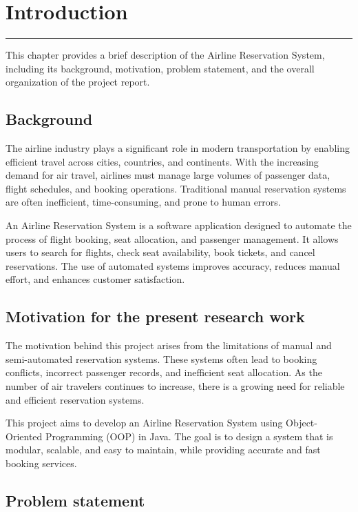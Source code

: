 \chapter{Introduction}
\noindent\rule{\linewidth}{2pt}
This chapter provides a brief description of the Airline Reservation System, including its background, motivation, problem statement, and the overall organization of the project report.

\section{Background}

The airline industry plays a significant role in modern transportation by enabling efficient travel across cities, countries, and continents. With the increasing demand for air travel, airlines must manage large volumes of passenger data, flight schedules, and booking operations. Traditional manual reservation systems are often inefficient, time-consuming, and prone to human errors.

An Airline Reservation System is a software application designed to automate the process of flight booking, seat allocation, and passenger management. It allows users to search for flights, check seat availability, book tickets, and cancel reservations. The use of automated systems improves accuracy, reduces manual effort, and enhances customer satisfaction.

\section{Motivation for the present research work}

The motivation behind this project arises from the limitations of manual and semi-automated reservation systems. These systems often lead to booking conflicts, incorrect passenger records, and inefficient seat allocation. As the number of air travelers continues to increase, there is a growing need for reliable and efficient reservation systems.

This project aims to develop an Airline Reservation System using Object-Oriented Programming (OOP) in Java. The goal is to design a system that is modular, scalable, and easy to maintain, while providing accurate and fast booking services.

\section{Problem statement}


